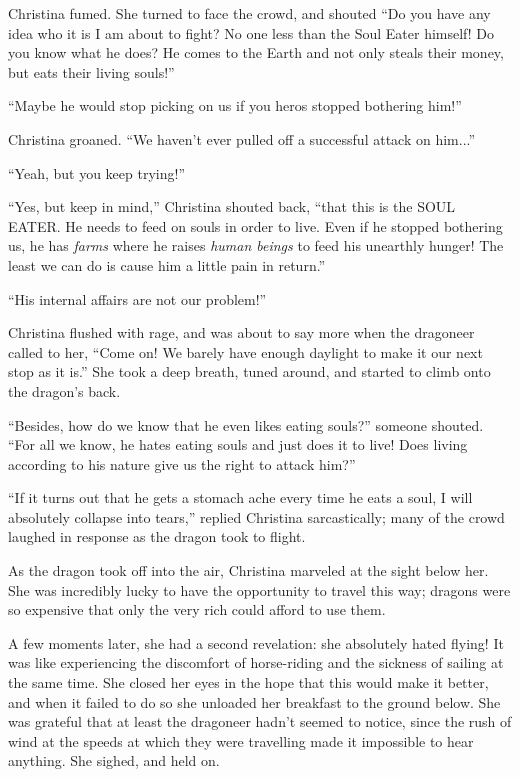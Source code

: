 \documentclass[showtrims,b6paper,draft,10pt]{memoir}
\begin{document}
Christina fumed.  She turned to face the crowd, and shouted ``Do you have any idea who it is I am about to fight?  No one less than the Soul Eater himself!  Do you know what he does?  He comes to the Earth and not only steals their money, but eats their living souls!''

``Maybe he would stop picking on us if you heros stopped bothering him!''

Christina groaned.  ``We haven't ever pulled off a successful attack on him...''

``Yeah, but you keep trying!''

``Yes, but keep in mind,''  Christina shouted back, ``that this is the SOUL EATER.  He needs to feed on souls in order to live.  Even if he stopped bothering us, he has \emph{farms} where he raises \emph{human beings} to feed his unearthly hunger!  The least we can do is cause him a little pain in return.''

``His internal affairs are not our problem!''

Christina flushed with rage, and was about to say more when the dragoneer called to her, ``Come on!  We barely have enough daylight to make it our next stop as it is.''  She took a deep breath, tuned around, and started to climb onto the dragon's back.

``Besides, how do we know that he even likes eating souls?''  someone shouted.  ``For all we know, he hates eating souls and just does it to live!  Does living according to his nature give us the right to attack him?''

``If it turns out that he gets a stomach ache every time he eats a soul, I will absolutely collapse into tears,'' replied Christina sarcastically;  many of the crowd laughed in response as the dragon took to flight.

\timeskip
As the dragon took off into the air, Christina marveled at the sight below her.  She was incredibly lucky to have the opportunity to travel this way;  dragons were so expensive that only the very rich could afford to use them.

A few moments later, she had a second revelation:  she absolutely hated flying!  It was like experiencing the discomfort of horse-riding and the sickness of sailing at the same time.  She closed her eyes in the hope that this would make it better, and when it failed to do so she unloaded her breakfast to the ground below.  She was grateful that at least the dragoneer hadn't seemed to notice, since the rush of wind at the speeds at which they were travelling made it impossible to hear anything.  She sighed, and held on.
\end{document}
